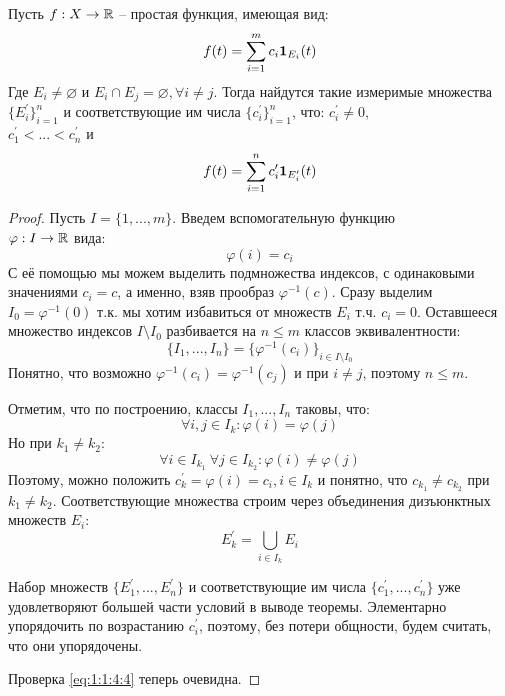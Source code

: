 \documentclass[../main.tex]{subfiles}
\begin{document}
\begin{lemma}
	Пусть $f : X \to \mathbb{R}$ -- простая функция, имеющая вид:
	\begin{equation*}
		f(t) = \sum_{i=1}^{m}{c_i \mathbf{1}_{E_i} (t)}
	\end{equation*}
	Где $E_i \neq \varnothing$ и $E_i \cap E_j = \varnothing, \forall i \neq j$. Тогда найдутся такие измеримые множества $\{E_i^\prime\}_{i=1}^{n}$ и соответствующие им числа $\{c_i^\prime\}_{i=1}^{n}$, что: $c_i^\prime \neq 0$, \\ $c_1^\prime < ... < c_n^\prime$ и
	\begin{equation}\label{eq:1:1:4:4}
		f(t) = \sum_{i=1}^{n}{c_i^\prime \mathbf{1}_{E_i^\prime} (t)}
	\end{equation}
\end{lemma}
\begin{proof}
	Пусть $I = \{1, ..., m\}$. Введем вспомогательную функцию \\ $\varphi : I \to \mathbb{R}$ вида:
	$$\varphi(i) = c_i$$
	С её помощью мы можем выделить подмножества индексов, с одинаковыми значениями $c_i = c$, а именно, взяв прообраз $\varphi^{-1} (c)$. Сразу выделим $I_0 = \varphi^{-1} (0)$ т.к. мы хотим избавиться от множеств $E_i$ т.ч. $c_i = 0$. Оставшееся множество индексов $I \setminus I_0$ разбивается на $n \leq m$ классов эквивалентности:
	$$\{I_1, ..., I_n\} = \{\varphi^{-1} (c_i)\}_{i \in I \setminus I_0}$$
	Понятно, что возможно $\varphi^{-1} (c_i) = \varphi^{-1} (c_j)$ и при $i \neq j$, поэтому $n \leq m$. 
	
	Отметим, что по построению, классы $I_1, ..., I_n$ таковы, что:
	$$\forall i, j \in I_k : \varphi(i) = \varphi(j)$$
	Но при $k_1 \neq k_2$:
	$$\forall i \in I_{k_1} \ \forall j \in I_{k_2} : \varphi(i) \neq \varphi(j)$$
	Поэтому, можно положить $c_k^\prime = \varphi(i) = c_i, i \in I_k$ и понятно, что $c_{k_1} \neq c_{k_2}$ при $k_1 \neq k_2$.
	Соответствующие множества строим через объединения дизъюнктных множеств $E_i$:
	\begin{equation*}
		E_k^\prime = \bigcup_{i \in I_k}{E_i}
	\end{equation*}

	Набор множеств $\{E_1^\prime, ..., E_n^\prime\}$ и соответствующие им числа $\{c_1^\prime, ..., c_n^\prime\}$ уже удовлетворяют большей части условий в выводе теоремы. Элементарно упорядочить по возрастанию $c_i^\prime$, поэтому, без потери общности, будем считать, что они упорядочены. 
	
	Проверка \eqref{eq:1:1:4:4} теперь очевидна.
\end{proof}
\end{document}
